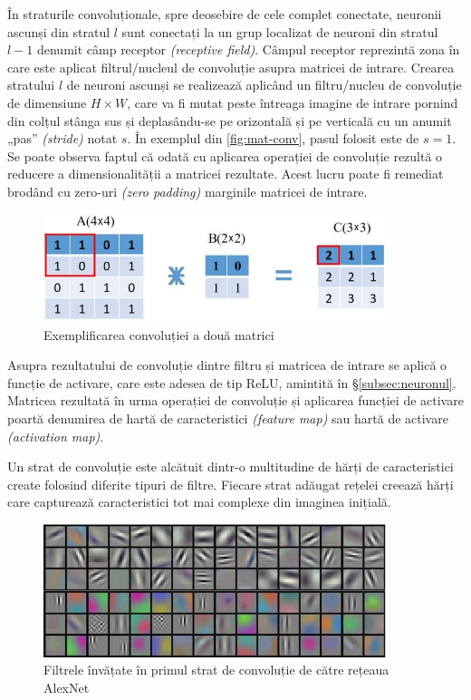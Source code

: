 În straturile convoluționale, spre deosebire de cele complet conectate, neuronii ascunși din stratul $l$ sunt conectați la un grup localizat de neuroni din stratul $l-1$ denumit câmp receptor \textit{(receptive field)}. Câmpul receptor reprezintă zona în care este aplicat filtrul/nucleul de convoluție asupra matricei de intrare. Crearea stratului $l$ de neuroni ascunși se realizează aplicând un filtru/nucleu de convoluție de dimensiune $H\times W$, care va fi mutat peste întreaga imagine de intrare pornind din colțul stânga sus și deplasându-se pe orizontală și pe verticală cu un anumit „pas” \textit{(stride)} notat $s$. În exemplul din \autoref{fig:mat-conv}, pasul folosit este de $s=1$. Se poate observa faptul că odată cu aplicarea operației de convoluție rezultă o reducere a dimensionalității a matricei rezultate. Acest lucru poate fi remediat brodând cu zero-uri \textit{(zero padding)} marginile matricei de intrare.
\begin{figure}[ht]
\centering
\includegraphics[width=10cm, keepaspectratio]{fig/cap2/conv-op.jpg}
\caption{Exemplificarea convoluției a două matrici \cite{vrejoiu:2019}}
\label{fig:mat-conv}
\end{figure}

Asupra rezultatului de convoluție dintre filtru și matricea de intrare se aplică o funcție de activare, care este adesea de tip ReLU, amintită în \S\ref{subsec:neuronul}. Matricea rezultată în urma operației de convoluție și aplicarea funcției de activare poartă denumirea de hartă de caracteristici \textit{(feature map)} sau hartă de activare \textit{(activation map)}.

Un strat de convoluție este alcătuit dintr-o multitudine de hărți de caracteristici create folosind diferite tipuri de filtre. Fiecare strat adăugat rețelei creează hărți care capturează caracteristici tot mai complexe din imaginea inițială.
\begin{figure}[ht]
\centering
\includegraphics[width=10cm, keepaspectratio]{fig/cap2/alexnet-filters.jpg}
\caption{Filtrele învățate în primul strat de convoluție de către rețeaua AlexNet \cite{alexnet:2012}}
\label{fig:alexnet-filters}
\end{figure}

